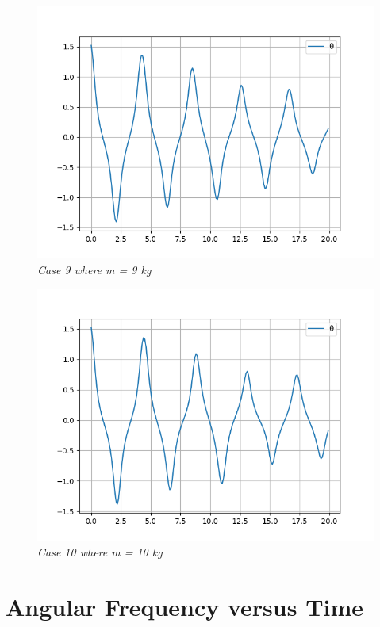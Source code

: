         \begin{figure}[H]
            \centering
            \includegraphics{Appendix/RExpPictures/A/am9.png}
            \caption{\textit{Case 9 where m = 9 kg}}
            \label{}
        \end{figure}
            
        \begin{figure}[H]
            \centering
            \includegraphics{Appendix/RExpPictures/A/am10.png}
            \caption{\textit{Case 10 where m = 10 kg}}
            \label{}
        \end{figure}
            
    \section{{Angular Frequency versus Time}}
            
